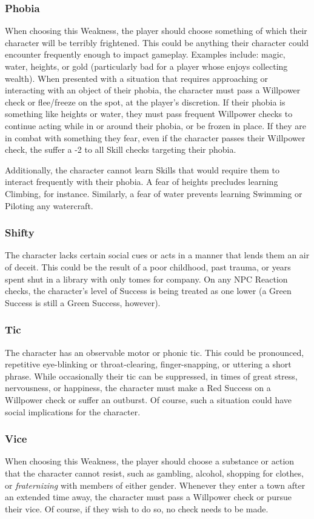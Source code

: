 \documentclass[oneside]{book}
\begin{document}
\begin{multicols}{2}
\subsubsection{Phobia}
When choosing this Weakness, the player should choose something of which their character will be terribly frightened. This could be anything their character could encounter frequently enough to impact gameplay. Examples include: magic, water, heights, or gold (particularly bad for a player whose enjoys collecting wealth). When presented with a situation that requires approaching or interacting with an object of their phobia, the character must pass a Willpower check or flee/freeze on the spot, at the player's discretion. If their phobia is something like heights or water, they must pass frequent Willpower checks to continue acting while in or around their phobia, or be frozen in place. If they are in combat with something they fear, even if the character passes their Willpower check, the suffer a -2 to all Skill checks targeting their phobia.

Additionally, the character cannot learn Skills that would require them to interact frequently with their phobia. A fear of heights precludes learning Climbing, for instance. Similarly, a fear of water prevents learning Swimming or Piloting any watercraft. 
\subsubsection{Shifty}
The character lacks certain social cues or acts in a manner that lends them an air of deceit. This could be the result of a poor childhood, past trauma, or years spent shut in a library with only tomes for company. On any NPC Reaction checks, the character's level of Success is being treated as one lower (a Green Success is still a Green Success, however). 
\subsubsection{Tic}
The character has an observable motor or phonic tic. This could be pronounced, repetitive eye-blinking or throat-clearing, finger-snapping, or uttering a short phrase. While occasionally their tic can be suppressed, in times of great stress, nervousness, or happiness, the character must make a Red Success on a Willpower check or suffer an outburst. Of course, such a situation could have social implications for the character. 
\subsubsection{Vice}
When choosing this Weakness, the player should choose a substance or action that the character cannot resist, such as gambling, alcohol, shopping for clothes, or \emph{fraternizing} with members of either gender. Whenever they enter a town after an extended time away, the character must pass a Willpower check or pursue their vice. Of course, if they wish to do so, no check needs to be made.


\end{multicols}
\end{document}
